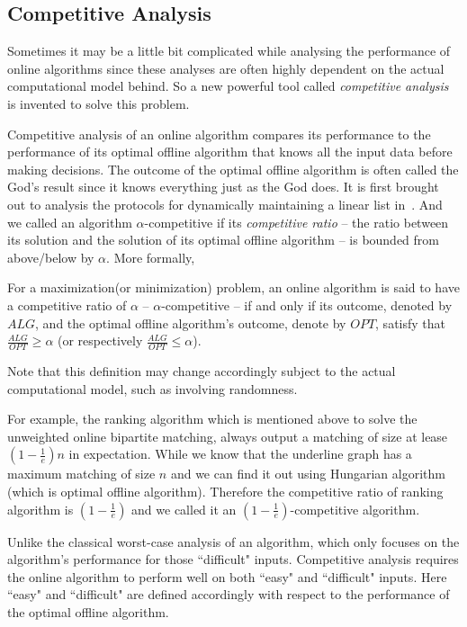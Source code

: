\subsection{Competitive Analysis}

Sometimes it may be a little bit complicated while analysing the performance 
of online algorithms since these analyses are often highly dependent on the
actual computational model behind. So a new powerful tool called
\emph{competitive analysis} is invented to solve this problem.

Competitive analysis of an online algorithm compares its performance to
the performance of its optimal offline algorithm that knows all the input 
data before making decisions.
The outcome of the optimal offline algorithm is often called the God's
result since it knows everything just as the God does.
It is first brought out to analysis the protocols for dynamically
maintaining a linear list in~\cite{sleator1985amortized}.
And we called an algorithm 
$\alpha$-competitive if its \emph{competitive ratio} 
-- the ratio between its solution and the solution of its optimal offline
algorithm -- is bounded from above/below by $\alpha$. More formally,

\begin{definition}
    For a maximization(or minimization) problem, an online algorithm is said
    to have a competitive ratio of $\alpha$ -- $\alpha$-competitive -- if
    and only if its outcome, denoted by $ALG$, and the optimal offline
    algorithm's outcome, denote by $OPT$, satisfy that
    $\frac{ALG}{OPT} \ge \alpha$ 
    (or respectively $\frac{ALG}{OPT} \le \alpha$).
\end{definition}

Note that this definition may change accordingly subject to the actual 
computational model, such as involving randomness.

For example, the ranking algorithm which is mentioned above to solve the
unweighted online bipartite matching, always output a matching of size
at lease $(1 - \frac{1}{e})n$ in expectation. While we know that the
underline graph has a maximum matching of size $n$ and we can find it out
using Hungarian algorithm (which is optimal offline algorithm). 
Therefore the competitive ratio of ranking algorithm is $(1 - \frac{1}{e})$
and we called it an $(1 - \frac{1}{e})$-competitive algorithm.

Unlike the classical worst-case analysis of an algorithm, which only 
focuses on the algorithm's performance for those ``difficult" inputs. 
Competitive analysis requires the online algorithm to perform well 
on both ``easy" and ``difficult" inputs. 
Here ``easy" and ``difficult" are defined accordingly with
respect to the performance of the optimal offline algorithm.

